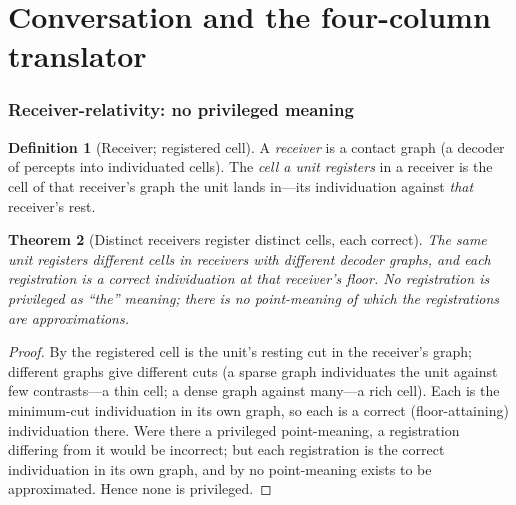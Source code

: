 \documentclass[twocolumn,11pt,a4paper]{article}
\theoremstyle{sup}
\newtheorem{theorem}{Theorem}[section]
\theoremstyle{definition}
\newtheorem{definition}[theorem]{Definition}
\theoremstyle{remark}
\begin{document}
\part{Conversation and the four-column translator}

\section{Receiver-relativity: no privileged meaning}
\label{sec:receiver}

\begin{definition}[Receiver; registered cell]
\label{def:receiver}
A \emph{receiver} is a contact graph (a decoder of percepts into individuated
cells). The \emph{cell a unit registers} in a receiver is the cell of that
receiver's graph the unit lands in---its individuation against \emph{that}
receiver's rest.
\end{definition}

\begin{theorem}[Distinct receivers register distinct cells, each correct]
\label{thm:receiver}
The same unit registers different cells in receivers with different decoder
graphs, and each registration is a correct individuation at that receiver's
floor. No registration is privileged as ``the'' meaning; there is no
point-meaning of which the registrations are approximations.
\end{theorem}

\begin{proof}
By  the registered cell is the unit's resting cut in the
receiver's graph; different graphs give different cuts (a sparse graph
individuates the unit against few contrasts---a thin cell; a dense graph against
many---a rich cell). Each is the minimum-cut individuation in its own graph, so
each is a correct (floor-attaining) individuation there. Were there a privileged
point-meaning, a registration differing from it would be incorrect; but each
registration is the correct individuation in its own graph, and by
 no point-meaning exists to be approximated. Hence none
is privileged.
\end{proof}
\end{document}
